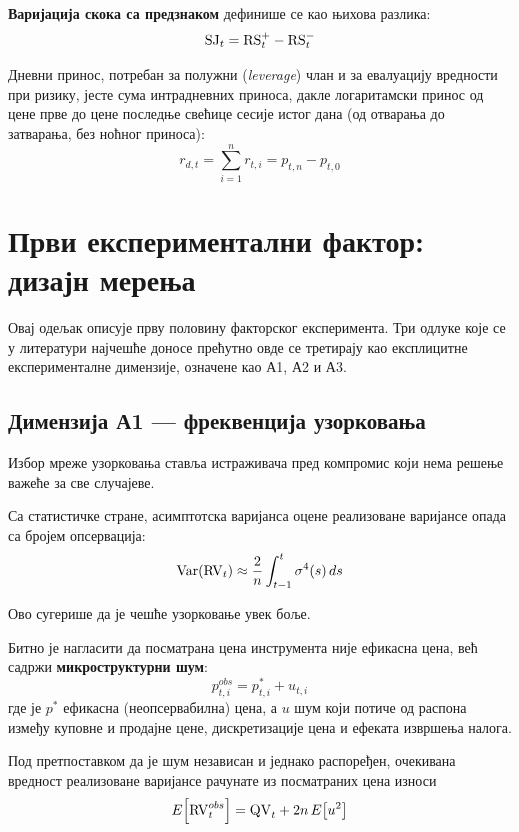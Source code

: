 \textbf{Варијација скока са предзнаком} дефинише се као њихова разлика:
\begin{equation}
\mathrm{SJ}_t = \mathrm{RS}_t^{+} - \mathrm{RS}_t^{-}
\end{equation}

Дневни принос, потребан за полужни (\textit{leverage}) члан и за евалуацију
вредности при ризику, јесте сума интрадневних приноса, дакле логаритамски принос од
цене прве до цене последње свећице сесије истог дана (од отварања до затварања, без
ноћног приноса):
\begin{equation}
r_{d,t} = \sum_{i=1}^{n} r_{t,i} = p_{t,n} - p_{t,0}
\end{equation}

\section{Први експериментални фактор: дизајн мерења}
\label{sec:dizajn}

Овај одељак описује прву половину факторског експеримента. Три одлуке које се у
литератури најчешће доносе прећутно овде се третирају као експлицитне
експерименталне димензије, означене као А1, А2 и А3.

\subsection{Димензија А1 — фреквенција узорковања}
\label{subsec:a1}

Избор мреже узорковања ставља истраживача пред компромис који нема решење важеће за
све случајеве.

Са статистичке стране, асимптотска варијанса оцене реализоване варијансе опада са
бројем опсервација:
\begin{equation}
\operatorname{Var}(\mathrm{RV}_t) \approx \frac{2}{n}\int_{t-1}^{t}\sigma^{4}(s)\,ds
\end{equation}

Ово сугерише да је чешће узорковање увек боље.

Битно је нагласити да посматрана цена инструмента није ефикасна цена, већ садржи
\textbf{микроструктурни шум}:
\begin{equation}
p_{t,i}^{obs} = p_{t,i}^{*} + u_{t,i}
\end{equation}
где је $p^{*}$ ефикасна (неопсервабилна) цена, а $u$ шум који потиче од распона
између куповне и продајне цене, дискретизације цена и ефеката извршења налога.

Под претпоставком да је шум независан и једнако распоређен, очекивана вредност
реализоване варијансе рачунате из посматраних цена износи
\parencite{zma2005,hansenLunde2006}
\begin{equation}
E\!\left[\mathrm{RV}_t^{obs}\right] = \mathrm{QV}_t + 2n\,E\!\left[u^{2}\right]
\label{eq:noise-bias}
\end{equation}

